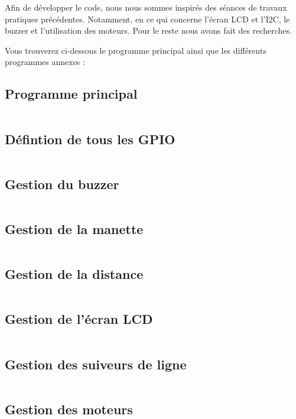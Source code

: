 Afin de développer le code, nous nous sommes inspirés des séances de travaux pratiques précédentes. Notamment, en ce qui concerne l'écran LCD et l'I2C, le buzzer et l'utilisation des moteurs. Pour le reste nous avons fait des recherches.

Vous trouverez ci-dessous le programme principal ainsi que les différents programmes annexes :

\subsection{Programme principal}
    \inputminted[breaklines]{c}{code/src/main.c}
\subsection{Défintion de tous les GPIO}
    \inputminted[breaklines]{c}{code/include/gpioPins.h}
\subsection{Gestion du buzzer}
    \inputminted[breaklines]{c}{code/src/buzzer.c}
\subsection{Gestion de la manette}
    \inputminted[breaklines]{c}{code/src/controller.c}
\subsection{Gestion de la distance}
    \inputminted[breaklines]{c}{code/src/distance.c}
\subsection{Gestion de l'écran LCD}
    \inputminted[breaklines]{c}{code/src/i2cLCD.c}
\subsection{Gestion des suiveurs de ligne}
    \inputminted[breaklines]{c}{code/src/lineFinder.c}
\subsection{Gestion des moteurs}
    \inputminted[breaklines]{c}{code/src/motors.c}

\newpage